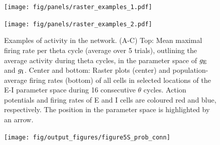 \documentclass[a4paper,12pt]{article}
\newcommand{\ssc}[3]{\ensuremath{#1_{\text{#2}_{\text{#3}}}}}
\newcommand{\gE      }{\ssc{g}      {\scriptsize{E}}{}}
\newcommand{\gI      }{\ssc{g}      {\scriptsize{I}}{}}
\begin{document}
\begin{figure}[p]
    \centering
        \texttt{[image: fig/panels/raster\_examples\_1.pdf]}
\end{figure}

\begin{figure}[p]
    \centering
        \texttt{[image: fig/panels/raster\_examples\_2.pdf]}
\end{figure}

\clearpage

\setcounter{figure}{0}
\renewcommand{\figurename}{Figure 5 - figure supplement}

\begin{figure}[H]
    \internallinenumbers
    \caption{Examples of activity in the network. (A-C) Top: Mean maximal
    firing rate per theta cycle (average over 5 trials), outlining the average
    activity during theta cycles, in the parameter space of $\gE$ and $\gI$.
    Center and bottom: Raster plots (center) and population-average firing
    rates (bottom) of all cells in selected locations of the E-I parameter
    space during 16 consecutive $\theta$ cycles. Action potentials and firing
    rates of E and I cells are coloured red and blue, respectively. The position
    in the parameter space is highlighted by an arrow.}
\end{figure}

\clearpage

\begin{figure}[p]
    \internallinenumbers
    \centering
        \texttt{[image: fig/output\_figures/figure5S\_prob\_conn]}
\end{figure}

\clearpage
\end{document}
